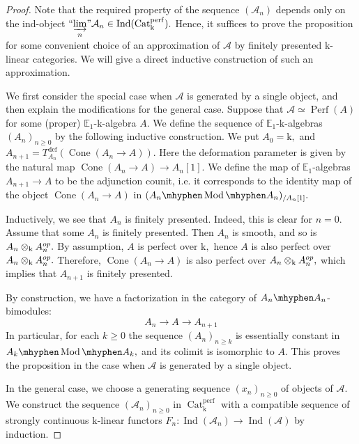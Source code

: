 \documentclass[11pt,leqno]{amsart}
\numberwithin{equation}{section}
\newcommand{\tens}[1]{%
  \mathbin{\mathop{\otimes}\displaylimits_{#1}}%
}
\newcommand{\hy}{\mhyphen}
\newcommand{\indlim}[1][]{\mathop{\varinjlim}\limits_{#1}}
\newcommand{\inddlim}[1][]{{``{\indlim[#1]}"}}
\newcommand{\Cat}{\operatorname{Cat}}
\newcommand{\Cone}{\operatorname{Cone}}
\newcommand{\deff}{\operatorname{def}}
\newcommand{\bE}{{\mathbb E}}
\newcommand{\mk}{\mathrm k}
\newcommand{\cA}{{\mathcal A}}
\newcommand{\Perf}{\operatorname{Perf}}
\newcommand{\perf}{\operatorname{perf}}
\newcommand{\Ind}{\operatorname{Ind}}
\newcommand{\Mod}{\operatorname{Mod}}
\begin{document}
\begin{proof}
Note that the required property of the sequence $(\cA_n)$ depends only on the ind-object $\inddlim[n]\cA_n\in\Ind(\Cat_{\mk}^{\perf}).$ Hence, it suffices to prove the proposition for some convenient choice of an approximation of $\cA$ by finitely presented $\mk$-linear categories. We will give a direct inductive construction of such an approximation.

We first consider the special case when $\cA$ is generated by a single object, and then explain the modifications for the general case. Suppose that $\cA\simeq\Perf(A)$ for some (proper) $\bE_1$-$\mk$-algebra $A.$ We define the sequence of $\bE_1$-$\mk$-algebras $(A_n)_{n\geq 0}$ by the following inductive construction. We put $A_0=\mk,$ and $A_{n+1}=T_{A_n}^{\deff}(\Cone(A_n\to A)).$ Here the deformation parameter is given by the natural map $\Cone(A_n\to A)\to A_n[1].$ We define the map of $\bE_1$-algebras $A_{n+1}\to A$ to be the adjunction counit, i.e. it corresponds to the identity map of the object $\Cone(A_n\to A)$ in $(A_n\hy\Mod\hy A_n)_{/A_n[1]}.$

Inductively, we see that $A_n$ is finitely presented. Indeed, this is clear for $n=0.$ Assume that some $A_n$ is finitely presented. Then $A_n$ is smooth, and so is $A_n\tens{\mk}A_n^{op}.$ By assumption, $A$ is perfect over $\mk,$ hence $A$ is also perfect over $A_n\tens{\mk}A_n^{op}.$ Therefore, $\Cone(A_n\to A)$ is also perfect over $A_n\tens{\mk}A_n^{op},$ which implies that $A_{n+1}$ is finitely presented.

By construction, we have a factorization in the category of $A_n\hy A_n$-bimodules:
\begin{equation*}
A_n\to A\to A_{n+1}
\end{equation*}
In particular, for each $k\geq 0$ the sequence $(A_n)_{n\geq k}$ is essentially constant in $A_k\hy\Mod\hy A_k,$ and its colimit is isomorphic to $A.$ This proves the proposition in the case when $\cA$ is generated by a single object.

In the general case, we choose a generating sequence $(x_n)_{n\geq 0}$ of objects of $\cA.$ We construct the sequence $(\cA_n)_{n\geq 0}$ in $\Cat^{\perf}_{\mk}$ with a compatible sequence of strongly continuous $\mk$-linear functors $F_n:\Ind(\cA_n)\to\Ind(\cA)$ by induction. 


\end{proof}
\end{document}
